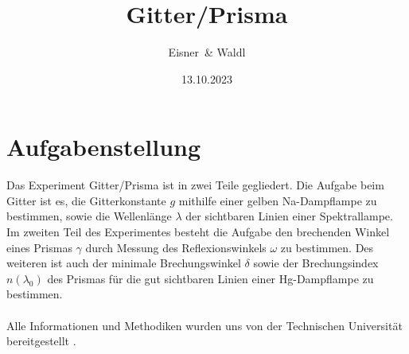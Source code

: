 \documentclass[12pt,a4paper,twoside]{article}
\begin{document}
\newcommand\laboratorynumber{2}
\title{Gitter/Prisma}
\newcommand\supervisor{Weis, Valentin}
\newcommand\groupnumber{42}

\newcommand\participantonelastname{Eisner}
\newcommand\participantonefirstname{Nico}
\newcommand\participantoneid{12214121}
\newcommand\participanttwolastname{Waldl}
\newcommand\participanttwofirstname{Philip}
\newcommand\participanttwoid{12214120}
\author{\participantonelastname \ \& \participanttwolastname}

\newcommand\degreeid{UB 033 678}
\newcommand\semester{23WS}
\date{13.10.2023}

\newcommand\coursetitle{Laborübungen 2: \\ Elektrizität, Magnetismus, Optik}

%



\tableofcontents
\newpage

\section{Aufgabenstellung} %
Das Experiment Gitter/Prisma ist in zwei Teile gegliedert. Die Aufgabe beim Gitter ist es, die Gitterkonstante $g$ mithilfe einer gelben Na-Dampflampe zu bestimmen, sowie die Wellenlänge $\lambda$ der sichtbaren Linien einer Spektrallampe. 
\\
Im zweiten Teil des Experimentes besteht die Aufgabe den brechenden Winkel eines Prismas $\gamma$ durch Messung des Reflexionswinkels $\omega$ zu bestimmen. 
Des weiteren ist auch der minimale Brechungswinkel $\delta$ sowie der Brechungsindex $n(\lambda_0)$ des Prismas für die gut sichtbaren Linien einer Hg-Dampflampe zu bestimmen. 
\\
\\
Alle Informationen und Methodiken wurden uns von der Technischen Universität bereitgestellt \cite{teachcenter2}. 
\end{document}
